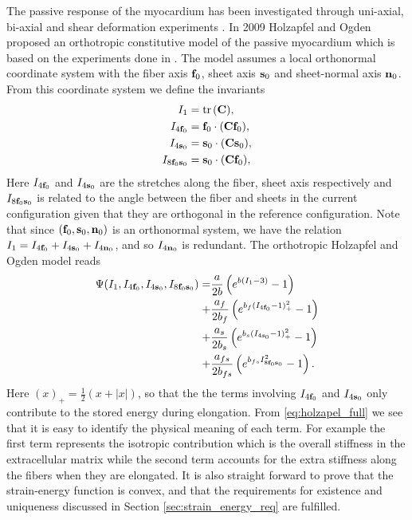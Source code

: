 The passive response of the myocardium has been investigated through
uni-axial, bi-axial and shear deformation experiments \cite{dokos2002shear}.
In 2009 Holzapfel and Ogden proposed an orthotropic constitutive model
of the passive myocardium \cite{holzapfel2009constitutive} which is
based on the experiments done in \cite{dokos2002shear}. The model
assumes a local orthonormal coordinate system with the fiber axis
$\mathbf{f}_0$, sheet axis $\mathbf{s}_0$ and sheet-normal axis $\mathbf{n}_0$. %
From this coordinate system we define the invariants
\begin{align}
  \begin{split}
    I_1 &= \mathrm{tr} \hspace{0.05cm}(\mathbf{C}) ,\\
    I_{4\mathbf{f}_0} &= \mathbf{f}_0 \cdot (\mathbf{C} \mathbf{f}_0),\\
    I_{4\mathbf{s}_0} &= \mathbf{s}_0 \cdot (\mathbf{C} \mathbf{s}_0),\\
    I_{8\mathbf{f}_0\mathbf{s}_0} &=  \mathbf{s}_0 \cdot (\mathbf{C} \mathbf{f}_0), 
  \end{split}
\end{align}
Here $I_{4\mathbf{f}_0} $ and $I_{4\mathbf{s}_0}$ are the stretches along the
fiber, sheet axis respectively and $I_{8\mathbf{f}_0\mathbf{s}_0}$ is
related to the angle between the fiber and sheets in the current
configuration given that they are orthogonal in the reference
configuration. Note that since $(\mathbf{f}_0, \mathbf{s}_0, \mathbf{n}_0)$ is an orthonormal
system, we have the relation $I_1 = I_{4\mathbf{f}_0} + I_{4\mathbf{s}_0} +I_{4\mathbf{n}_0}$,
and so $I_{4\mathbf{n}_0}$ is redundant. The orthotropic Holzapfel and Ogden
model reads
\begin{align}
  \label{eq:holzapel_full}
  \begin{split}
  \Psi(I_1, I_{4\mathbf{f}_0},  I_{4\mathbf{s}_0},  I_{8\mathbf{f}_0\mathbf{s}_0}) =& \frac{a}{2 b} \left( e^{ b (I_1 - 3)}  -1 \right)\\
  +& \frac{a_f}{2 b_f} \left( e^{ b_f (I_{4\mathbf{f}_0} - 1)_+^2} -1 \right) \\
  +& \frac{a_s}{2 b_s} \left( e^{ b_s (I_{4\mathbf{s}_0} - 1)_+^2} -1 \right)\\
  +& \frac{a_{fs}}{2 b_{fs}} \left( e^{ b_{fs} I_{8\mathbf{f}_0\mathbf{s}_0}^2} -1 \right).
\end{split}
\end{align}
Here $( x )_+ = \frac{1}{2} \left( x + |x| \right)$, so that the
the terms involving $I_{4\mathbf{f}_0}$ and $I_{4\mathbf{s}_0}$ only contribute to the
stored energy during elongation. From \eqref{eq:holzapel_full} we see
that it is easy to identify the physical meaning of each term. For
example the first term represents the isotropic contribution which is
the overall stiffness in the extracellular matrix while the second
term accounts for the extra stiffness along the fibers when they are
elongated. It is also straight forward to prove that the strain-energy
function is convex, and that the requirements for existence and
uniqueness discussed in Section \ref{sec:strain_energy_req} are
fulfilled.

